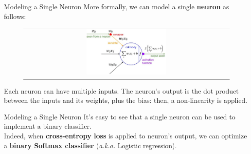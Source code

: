 \documentclass[aspectratio=169]{beamer}
\begin{document}

\begin{frame}{Modeling a Single Neuron}
More formally, we can model a single \textbf{neuron} as follows:
\begin{figure}
\begin{tabular}{c}
\includegraphics[width=0.4\textwidth]{img/dnn/single_neuron.jpg}
\end{tabular}
\end{figure}
Each neuron can have multiple inputs. The neuron's output is the dot product between the inputs and its weights, plus the bias: then, a non-linearity is applied.
\end{frame}


\begin{frame}{Modeling a Single Neuron}
It's easy to see that a single neuron can be used to implement a binary classifier.\\
\vspace{1cm}
Indeed, when \textbf{cross-entropy loss} is applied to neuron's output, we can optimize a \textbf{binary Softmax classifier} (\emph{a.k.a.} Logistic regression).
\end{frame}

\end{document}
